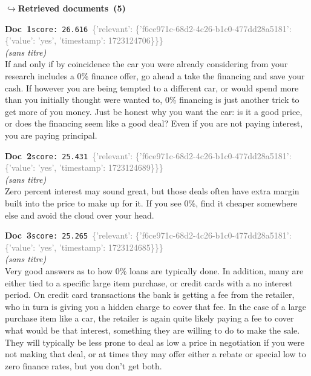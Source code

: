 \documentclass[a4paper,11pt]{article}
\begin{document}
\noindent\hfill{\footnotesize\textcolor{doccolor}{\textbf{$\hookrightarrow$\enspace Retrieved documents~(5)}}}
\begin{docenv}
{\footnotesize\textcolor{doccolor}{\textbf{Doc~1}}}\hfill{\tiny\texttt{score:~26.616}}\ {\tiny\textcolor{gray}{\{'relevant': \{'f6ce971c-68d2-4c26-b1c0-477dd28a5181': \{'value': 'yes', 'timestamp': 1723124706\}\}\}}}\\[3pt]
{\small\textit{(sans titre)}}\\[2pt]
\vspace{2pt}
{\footnotesize 
If and only if by coincidence the car you were already considering from your research includes a 0\% finance offer, go ahead a take the financing and save your cash. If however you are being tempted to a different car, or would spend more than you initially thought were wanted to, 0\% financing is just another trick to get more of you money. Just be honest why you want the car: is it a good price, or does the financing seem like a good deal?  Even if you are not paying interest, you are paying principal.}
\end{docenv}
\begin{docenv}
{\footnotesize\textcolor{doccolor}{\textbf{Doc~2}}}\hfill{\tiny\texttt{score:~25.431}}\ {\tiny\textcolor{gray}{\{'relevant': \{'f6ce971c-68d2-4c26-b1c0-477dd28a5181': \{'value': 'yes', 'timestamp': 1723124689\}\}\}}}\\[3pt]
{\small\textit{(sans titre)}}\\[2pt]
\vspace{2pt}
{\footnotesize 
Zero percent interest may sound great, but those deals often have extra margin built into the price to make up for it. If you see 0\%, find it cheaper somewhere else and avoid the cloud over your head.}
\end{docenv}
\begin{docenv}
{\footnotesize\textcolor{doccolor}{\textbf{Doc~3}}}\hfill{\tiny\texttt{score:~25.265}}\ {\tiny\textcolor{gray}{\{'relevant': \{'f6ce971c-68d2-4c26-b1c0-477dd28a5181': \{'value': 'yes', 'timestamp': 1723124685\}\}\}}}\\[3pt]
{\small\textit{(sans titre)}}\\[2pt]
\vspace{2pt}
{\footnotesize 
Very good answers as to how 0\% loans are typically done.  In addition, many are either tied to a specific large item purchase, or credit cards with a no interest period.  On credit card transactions the bank is getting a fee from the retailer, who in turn is giving you a hidden charge to cover that fee.  In the case of a large purchase item like a car, the retailer is again quite likely paying a fee to cover what would be that interest, something they are willing to do to make the sale.  They will typically be less prone to deal as low a price in negotiation if you were not making that deal, or at times they may offer either a rebate or special low to zero finance rates, but you don't get both.}
\end{docenv}
\end{document}
